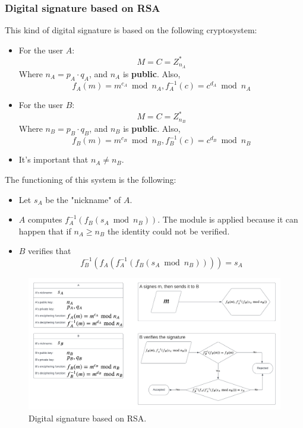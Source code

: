 \subsubsection{Digital signature based on RSA}
This kind of digital signature is based on the following cryptosystem:
\begin{itemize}
    \item For the user $A$: \[M = C = Z_{n_{A}}^{*}\] Where $n_{A} = p_{A} \cdot q_{A}$, and $n_{A}$ is \textbf{public}. Also,
    \[f_{A}(m) = m^{c_{A}} \bmod n_{A}, f_{A}^{-1}(c) = c^{d_{A}} \bmod n_{A}\]
    \item For the user $B$: \[M = C = Z_{n_{B}}^{*}\] Where $n_{B} = p_{B} \cdot q_{B}$, and $n_{B}$ is \textbf{public}. Also,
    \[f_{B}(m) = m^{c_{B}} \bmod n_{B}, f_{B}^{-1}(c) = c^{d_{B}} \bmod n_{B}\]
    \item It's important that $n_{A} \neq n_{B}$.
\end{itemize}
The functioning of this system is the following:
\begin{itemize}
    \item Let $s_{A}$ be the "nickname" of $A$.
    \item $A$ computes $f_{A}^{-1}(f_{B}(s_{A} \bmod n_{B}))$. The module is applied because it can happen that if $n_{A} \geq n_{B}$ the identity could not be verified.
    \item $B$ verifies that
    \[
    f_{B}^{-1}(f_{A}(f_{A}^{-1}(f_{B}(s_{A} \bmod n_{B})))) = s_{A}
    \]
\end{itemize}
\begin{figure}[h]
    \centering
    \includegraphics[width=\textwidth]{img/DigSig_RSA.png}
    \caption{Digital signature based on RSA.}
\end{figure}

